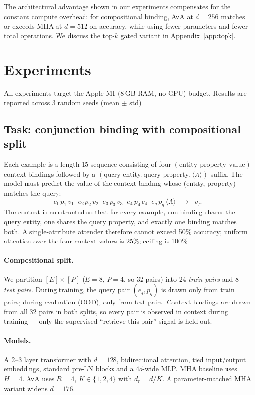 \documentclass{article}
\begin{document}
The architectural advantage shown in our experiments compensates for
the constant compute overhead: for compositional binding, AvA at
$d{=}256$ matches or exceeds MHA at $d{=}512$ on accuracy, while using
fewer parameters and fewer total operations. We discuss the top-$k$
gated variant in Appendix~\ref{app:topk}.

\section{Experiments}
\label{sec:experiments}

All experiments target the Apple M1 (8\,GB RAM, no GPU) budget.
Results are reported across 3 random seeds (mean $\pm$ std).

\subsection{Task: conjunction binding with compositional split}

Each example is a length-15 sequence consisting of four
$(\text{entity}, \text{property}, \text{value})$ context bindings
followed by a $(\text{query entity}, \text{query property}, \langle A
\rangle)$ suffix. The model must predict the value of the context
binding whose (entity, property) matches the query:
\[
  e_1\,p_1\,v_1 \;\; e_2\,p_2\,v_2 \;\; e_3\,p_3\,v_3 \;\; e_4\,p_4\,v_4
  \;\; e_q\,p_q\,\langle A \rangle \;\;\longrightarrow\;\; v_{q}.
\]
The context is constructed so that for every example, one binding
shares the query entity, one shares the query property, and exactly
one binding matches both. A single-attribute attender therefore cannot
exceed 50\% accuracy; uniform attention over the four context values is
25\%; ceiling is 100\%.

\paragraph{Compositional split.} We partition $[E] \times [P]$ ($E{=}8$,
$P{=}4$, so 32 pairs) into 24 \emph{train pairs} and 8 \emph{test
pairs}. During training, the query pair $(e_q, p_q)$ is drawn only from
train pairs; during evaluation (OOD), only from test pairs. Context
bindings are drawn from all 32 pairs in both splits, so every pair is
observed in context during training --- only the supervised
``retrieve-this-pair'' signal is held out.

\paragraph{Models.} A 2--3 layer transformer with $d=128$, bidirectional
attention, tied input/output embeddings, standard pre-LN blocks and a
$4 d$-wide MLP. MHA baseline uses $H=4$. AvA uses $R=4$, $K \in \{1,
2, 4\}$ with $d_r = d/K$. A parameter-matched MHA variant widens
$d{=}176$.
\end{document}
